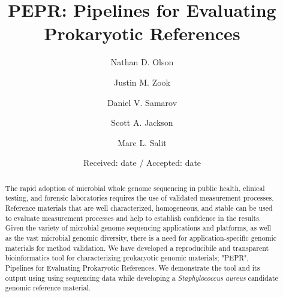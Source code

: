 \documentclass[smallextended]{svjour3}\usepackage[]{graphicx}\usepackage[]{color}
\begin{document}

\title{PEPR: Pipelines for Evaluating Prokaryotic References}


\author{Nathan D. Olson \and
        Justin M. Zook \and
        Daniel V. Samarov \and
        Scott A. Jackson \and
        Marc L. Salit
}



\date{Received: date / Accepted: date}


\maketitle



\begin{abstract}
The rapid adoption of microbial whole genome sequencing in public health, clinical testing, and forensic laboratories requires the use of validated measurement processes. Reference materials that are well characterized, homogeneous, and stable can be used to evaluate measurement processes and help to establish confidence in the results. Given the variety of microbial genome sequencing applications and platforms, as well as the vast microbial genomic diversity, there is a need for application-specific genomic materials for method validation. We have developed a reproducibile and transparent bioinformatics tool for characterizing prokaryotic genomic materials; "PEPR", Pipelines for Evaluating Prokaryotic References. We demonstrate the tool and its output using using sequencing data while developing a \textit{Staphylococcus aureus} candidate genomic reference material.


\end{abstract}
\end{document}
